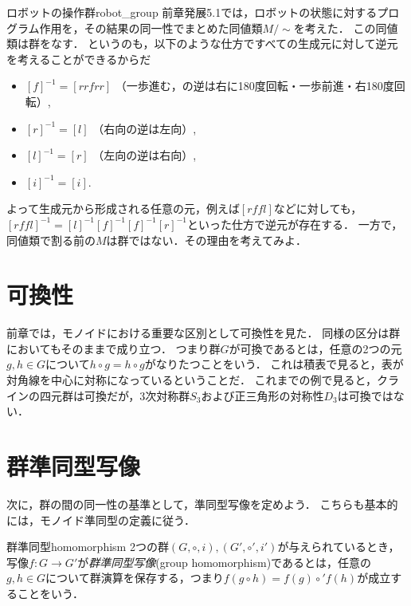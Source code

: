 \documentclass[11pt,a4paper]{jsarticle}
\begin{document}
\begin{rei}{ロボットの操作群}{robot_group}
    前章発展5.1では，ロボットの状態に対するプログラム作用を，その結果の同一性でまとめた同値類$M/\sim$を考えた．
    この同値類は群をなす．
    というのも，以下のような仕方ですべての生成元に対して逆元を考えることができるからだ
    \begin{itemize}
        \item $[f]^{-1} = [rrfrr]$ （一歩進む，の逆は右に180度回転・一歩前進・右180度回転）,
        \item $[r]^{-1} = [l]$ （右向の逆は左向）,
        \item $[l]^{-1} = [r]$ （左向の逆は右向）,
        \item $[i]^{-1} = [i]$.
    \end{itemize}
    よって生成元から形成される任意の元，例えば$[rffl]$などに対しても，$[rffl]^{-1} = [l]^{-1} [f]^{-1} [f]^{-1} [r]^{-1}$といった仕方で逆元が存在する．
    一方で，同値類で割る前の$M$は群ではない．その理由を考えてみよ．
\end{rei}


\section{可換性}
前章では，モノイドにおける重要な区別として可換性を見た．
同様の区分は群においてもそのままで成り立つ．
つまり群$G$が可換であるとは，任意の2つの元$g,h \in G$について$h \circ g = h \circ g$がなりたつことをいう．
これは積表で見ると，表が対角線を中心に対称になっているということだ．
これまでの例で見ると，クラインの四元群は可換だが，3次対称群$S_3$および正三角形の対称性$D_3$は可換ではない．


\section{群準同型写像}
次に，群の間の同一性の基準として，準同型写像を定めよう．
こちらも基本的には，モノイド準同型の定義に従う．

\begin{dfn}{群準同型}{homomorphism}
    2つの群$(G, \circ, i), (G', \circ', i')$が与えられているとき，写像$f:G \to G'$が\emph{群準同型写像}(group homomorphism)であるとは，任意の$g,h \in G$について群演算を保存する，つまり$f(g\circ h) = f(g) \circ' f(h)$が成立することをいう．
\end{dfn}    
\end{document}

